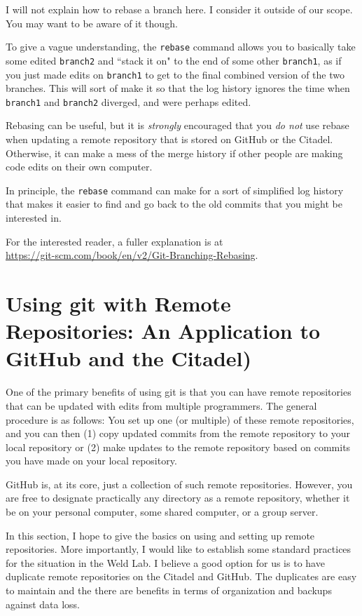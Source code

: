 \documentclass[11pt]{article}
\begin{document}
I will not explain how to rebase a branch here.  I consider it outside of our scope.  You may want to be aware of it though.

To give a vague understanding, the \texttt{rebase} command allows you to basically take some edited \texttt{branch2} and ``stack it on" to the end of some other \texttt{branch1}, as if you just made edits on \texttt{branch1} to get to the final combined version of the two branches.  This will sort of make it so that the log history ignores the time when \texttt{branch1} and \texttt{branch2} diverged, and were perhaps edited.

Rebasing can be useful, but it is \emph{strongly} encouraged that you \emph{do not} use rebase when updating a remote repository that is stored on GitHub or the Citadel.  Otherwise, it can make a mess of the merge history if other people are making code edits on their own computer.

In principle, the \texttt{rebase} command can make for a sort of simplified log history that makes it easier to find and go back to the old commits that you might be interested in.

For the interested reader, a fuller explanation is at\\ \url{https://git-scm.com/book/en/v2/Git-Branching-Rebasing}.

\section{Using git with Remote Repositories: An Application to GitHub and the Citadel)}
\label{sec:Remotes}

One of the primary benefits of using git is that you can have remote repositories that can be updated with edits from multiple programmers.  The general procedure is as follows: You set up one (or multiple) of these remote repositories, and you can then (1) copy updated commits from the remote repository to your local repository or (2) make updates to the remote repository based on commits you have made on your local repository.

GitHub is, at its core, just a collection of such remote repositories.  However, you are free to designate practically any directory as a remote repository, whether it be on your personal computer, some shared computer, or a group server.

In this section, I hope to give the basics on using and setting up remote repositories.  More importantly, I would like to establish some standard practices for the situation in the Weld Lab.  I believe a good option for us is to have duplicate remote repositories on the Citadel and GitHub. The duplicates are easy to maintain and the there are benefits in terms of organization and backups against data loss.
\end{document}
